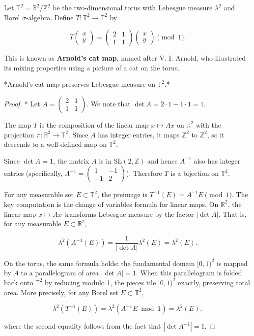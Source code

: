 Let $\mathbb{T}^2 = \mathbb{R}^2 / \mathbb{Z}^2$ be the two-dimensional torus with Lebesgue measure $\lambda^2$ and Borel $\sigma$-algebra. Define $T: \mathbb{T}^2 \to \mathbb{T}^2$ by

\[
T\begin{pmatrix} x \\ y \end{pmatrix} = \begin{pmatrix} 2 & 1 \\ 1 & 1 \end{pmatrix} \begin{pmatrix} x \\ y \end{pmatrix} \pmod{1}.
\]

This is known as \textbf{Arnold's cat map}, named after V. I. Arnold, who illustrated its mixing properties using a picture of a cat on the torus.

\begin{proposition}\label{prop:8.10.}
*Arnold's cat map preserves Lebesgue measure on $\mathbb{T}^2$.*
\end{proposition}


\begin{proof}
* Let $A = \begin{pmatrix} 2 & 1 \\ 1 & 1 \end{pmatrix}$. We note that $\det A = 2 \cdot 1 - 1 \cdot 1 = 1$.

The map $T$ is the composition of the linear map $x \mapsto Ax$ on $\mathbb{R}^2$ with the projection $\pi: \mathbb{R}^2 \to \mathbb{T}^2$. Since $A$ has integer entries, it maps $\mathbb{Z}^2$ to $\mathbb{Z}^2$, so it descends to a well-defined map on $\mathbb{T}^2$.

Since $\det A = 1$, the matrix $A$ is in $\text{SL}(2, \mathbb{Z})$ and hence $A^{-1}$ also has integer entries (specifically, $A^{-1} = \begin{pmatrix} 1 & -1 \\ -1 & 2 \end{pmatrix}$). Therefore $T$ is a bijection on $\mathbb{T}^2$.

For any measurable set $E \subset \mathbb{T}^2$, the preimage is $T^{-1}(E) = A^{-1}E \pmod{1}$. The key computation is the change of variables formula for linear maps. On $\mathbb{R}^2$, the linear map $x \mapsto Ax$ transforms Lebesgue measure by the factor $|\det A|$. That is, for any measurable $E \subset \mathbb{R}^2$,

\[
\lambda^2(A^{-1}(E)) = \frac{1}{|\det A|} \lambda^2(E) = \lambda^2(E).
\]

On the torus, the same formula holds: the fundamental domain $[0,1)^2$ is mapped by $A$ to a parallelogram of area $|\det A| = 1$. When this parallelogram is folded back onto $\mathbb{T}^2$ by reducing modulo 1, the pieces tile $[0,1)^2$ exactly, preserving total area. More precisely, for any Borel set $E \subset \mathbb{T}^2$,

\[
\lambda^2(T^{-1}(E)) = \lambda^2(A^{-1}E \bmod 1) = \lambda^2(E),
\]

where the second equality follows from the fact that $|\det A^{-1}| = 1$.
\end{proof}


